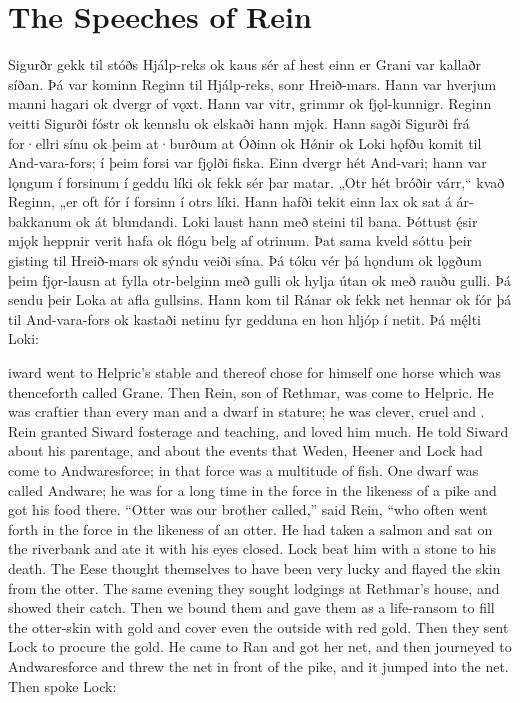 \section{The Speeches of Rein}

\bpg\bpa Sigurðr gekk til stóðs Hjálp-reks ok kaus sér af hest einn er Grani var kallaðr síðan. Þá var kominn Reginn til Hjálp-reks, sonr Hreið-mars. Hann var hverjum manni hagari ok dvergr of vǫxt. Hann var vitr, grimmr ok fjǫl-kunnigr. Reginn veitti Sigurði fóstr ok kennslu ok elskaði hann mjǫk. Hann sagði Sigurði frá for·ellri sínu ok þeim at·burðum at Óðinn ok Hǿnir ok Loki hǫfðu komit til And-vara-fors; í þeim forsi var fjǫlði fiska. Einn dvergr hét And-vari; hann var lǫngum í forsinum í geddu líki ok fekk sér þar matar. „Otr hét bróðir várr,“ kvað Reginn, „er oft fór í forsinn í otrs líki. Hann hafði tekit einn lax ok sat á ár-bakkanum ok át blundandi. Loki laust hann með steini til bana. Þóttust ę́sir mjǫk heppnir verit hafa ok flógu belg af otrinum. Þat sama kveld sóttu þeir gisting til Hreið-mars ok sýndu veiði sína. Þá tóku vér þá hǫndum ok lǫgðum þeim fjǫr-lausn at fylla otr-belginn með gulli ok hylja útan ok með rauðu gulli. Þá sendu þeir Loka at afla gullsins. Hann kom til Ránar ok fekk net hennar ok fór þá til And-vara-fors ok kastaði netinu fyr gedduna en hon hljóp í netit. Þá mę́lti Loki:\epa

iward went to Helpric’s stable and thereof chose for himself one horse which was thenceforth called Grane. Then Rein, son of Rethmar, was come to Helpric. He was craftier than every man and a dwarf in stature; he was clever, cruel and . Rein granted Siward fosterage and teaching, and loved him much. He told Siward about his parentage, and about the events that Weden, Heener and Lock had come to Andwaresforce; in that force was a multitude of fish. One dwarf was called Andware; he was for a long time in the force in the likeness of a pike and got his food there. “Otter was our brother called,” said Rein, “who often went forth in the force in the likeness of an otter. He had taken a salmon and sat on the riverbank and ate it with his eyes closed. Lock beat him with a stone to his death. The Eese thought themselves to have been very lucky and flayed the skin from the otter. The same evening they sought lodgings at Rethmar’s house, and showed their catch. Then we bound them and gave them as a life-ransom to fill the otter-skin with gold and cover even the outside with red gold. Then they sent Lock to procure the gold. He came to Ran and got her net, and then journeyed to Andwaresforce and threw the net in front of the pike, and it jumped into the net. Then spoke Lock:\epb\epg


